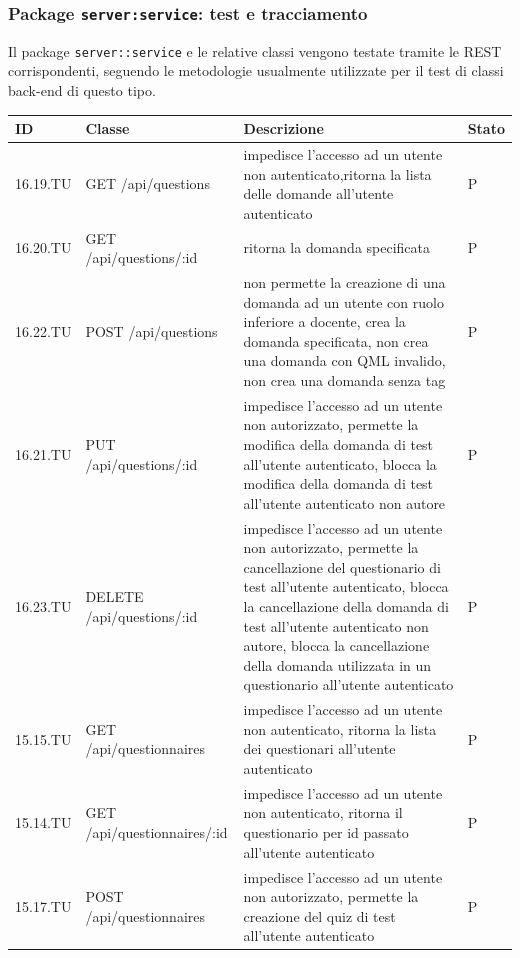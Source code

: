 \documentclass[12pt,a4paper]{article}
\begin{document}
\subsubsection{Package \texttt{server:service}: test e tracciamento}
Il package \texttt{server::service} e le relative classi vengono testate tramite le  REST corrispondenti, seguendo le metodologie usualmente utilizzate per il test di classi back-end di questo tipo.
\begin{center}
	\begin{longtable}[]{p{} p{} p{} p{}}
			\midrule
			\textbf{ID} & \textbf{Classe} & \textbf{Descrizione} & \textbf{Stato} \\
			 \midrule
			 \midrule
			16.19.TU &  GET /api/questions & impedisce l'accesso ad un utente non autenticato,ritorna la lista delle domande all'utente autenticato & P \\ \midrule
			16.20.TU &  GET /api/questions/:id & ritorna la domanda specificata & P \\ \midrule
			16.22.TU &  POST /api/questions & non permette la creazione di una domanda ad un utente con ruolo inferiore a docente, crea la domanda specificata, non crea una domanda con QML invalido, non crea una domanda senza tag & P \\ \midrule
			16.21.TU &  PUT /api/questions/:id & impedisce l'accesso ad un utente non autorizzato, permette la modifica della domanda di test all'utente autenticato, blocca la modifica della domanda di test all'utente autenticato non autore & P \\ \midrule
			16.23.TU &  DELETE /api/questions/:id & impedisce l'accesso ad un utente non autorizzato, permette la cancellazione del questionario di test all'utente autenticato, blocca la cancellazione della domanda di test all'utente autenticato non autore, blocca la cancellazione della domanda utilizzata in un questionario all'utente autenticato & P \\ \midrule
			15.15.TU &  GET /api/questionnaires & impedisce l'accesso ad un utente non autenticato, ritorna la lista dei questionari all'utente autenticato & P \\ \midrule
			15.14.TU &  GET /api/questionnaires/:id & impedisce l'accesso ad un utente non autenticato, ritorna il questionario per id passato all'utente autenticato & P \\ \midrule
			15.17.TU &  POST /api/questionnaires & impedisce l'accesso ad un utente non autorizzato, permette la creazione del quiz di test all'utente autenticato & P \\ \midrule

\end{longtable}
\end{center}
\end{document}
